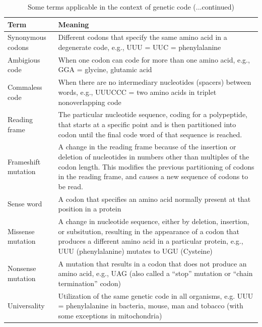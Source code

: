 \documentclass[11pt,dvipsnames,ignorenonframetext,aspectratio=169]{beamer}
\begin{document}
\begin{frame}{}
\protect\hypertarget{section-4}{}

\begin{table}[t]

\caption{\label{tab:gene-terms2}Some terms applicable in the context of genetic code (...continued)}
\centering
\fontsize{6}{8}\selectfont
\begin{tabular}{>{\raggedright\arraybackslash}p{8em}>{\raggedright\arraybackslash}p{40em}}
\toprule
Term & Meaning\\
\midrule
\rowcolor{gray!6}  Synonymous codons & Different codons that specify the same amino acid in a degenerate code, e.g., UUU = UUC = phenylalanine\\
Ambigious code & When one codon can code for more than one amino acid, e.g., GGA = glycine, glutamic acid\\
\rowcolor{gray!6}  Commaless code & When there are no intermediary nucleotides (spacers) between words, e.g., UUUCCC = two amino acids in triplet nonoverlapping code\\
Reading frame & The particular nucleotide sequence, coding for a polypeptide, that starts at a specific point and is then partitioned into codon until the final code word of that sequence is reached.\\
\rowcolor{gray!6}  Frameshift mutation & A change in the reading frame because of the insertion or deletion of nucleotides in numbers other than multiples of the codon length. This modifies the previous partitioning of codons in the reading frame, and causes a new sequence of codons to be read.\\
\addlinespace
Sense word & A codon that specifies an amino acid normally present at that position in a protein\\
\rowcolor{gray!6}  Missense mutation & A change in nucleotide sequence, either by deletion, insertion, or subsitution, resulting in the appearance of a codon that produces a different amino acid in a particular protein, e.g., UUU (phenylalanine) mutates to UGU (Cysteine)\\
Nonsense mutation & A mutation that results in a codon that does not produce an amino acid, e.g., UAG (also called a “stop” mutation or “chain termination” codon)\\
\rowcolor{gray!6}  Universality & Utilization of the same genetic code in all organisms, e.g. UUU = phenylalanine in bacteria, mouse, man and tobacco (with some exceptions in mitochondria)\\
\bottomrule
\end{tabular}
\end{table}

\end{frame}
\end{document}
